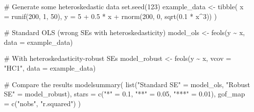 \documentclass[
  letterpaper,
  DIV=11,
  numbers=noendperiod]{scrreprt}
\newenvironment{Shaded}{\begin{snugshade}}{\end{snugshade}}
\newcommand{\AttributeTok}[1]{\textcolor[rgb]{0.40,0.45,0.13}{#1}}
\newcommand{\CommentTok}[1]{\textcolor[rgb]{0.37,0.37,0.37}{#1}}
\newcommand{\DecValTok}[1]{\textcolor[rgb]{0.68,0.00,0.00}{#1}}
\newcommand{\FloatTok}[1]{\textcolor[rgb]{0.68,0.00,0.00}{#1}}
\newcommand{\FunctionTok}[1]{\textcolor[rgb]{0.28,0.35,0.67}{#1}}
\newcommand{\NormalTok}[1]{\textcolor[rgb]{0.00,0.23,0.31}{#1}}
\newcommand{\OtherTok}[1]{\textcolor[rgb]{0.00,0.23,0.31}{#1}}
\newcommand{\SpecialCharTok}[1]{\textcolor[rgb]{0.37,0.37,0.37}{#1}}
\newcommand{\StringTok}[1]{\textcolor[rgb]{0.13,0.47,0.30}{#1}}
\begin{document}
\begin{Shaded}
\begin{Highlighting}[]
\CommentTok{\# Generate some heteroskedastic data}
\FunctionTok{set.seed}\NormalTok{(}\DecValTok{123}\NormalTok{)}
\NormalTok{example\_data }\OtherTok{\textless{}{-}} \FunctionTok{tibble}\NormalTok{(}
    \AttributeTok{x =} \FunctionTok{runif}\NormalTok{(}\DecValTok{200}\NormalTok{, }\DecValTok{1}\NormalTok{, }\DecValTok{50}\NormalTok{),}
    \AttributeTok{y =} \DecValTok{5} \SpecialCharTok{+} \FloatTok{0.5} \SpecialCharTok{*}\NormalTok{ x }\SpecialCharTok{+} \FunctionTok{rnorm}\NormalTok{(}\DecValTok{200}\NormalTok{, }\DecValTok{0}\NormalTok{, }\FunctionTok{sqrt}\NormalTok{(}\FloatTok{0.1} \SpecialCharTok{*}\NormalTok{ x}\SpecialCharTok{\^{}}\DecValTok{3}\NormalTok{))}
\NormalTok{)}

\CommentTok{\# Standard OLS (wrong SEs with heteroskedasticity)}
\NormalTok{model\_ols }\OtherTok{\textless{}{-}} \FunctionTok{feols}\NormalTok{(y }\SpecialCharTok{\textasciitilde{}}\NormalTok{ x, }\AttributeTok{data =}\NormalTok{ example\_data)}

\CommentTok{\# With heteroskedasticity{-}robust SEs}
\NormalTok{model\_robust }\OtherTok{\textless{}{-}} \FunctionTok{feols}\NormalTok{(y }\SpecialCharTok{\textasciitilde{}}\NormalTok{ x, }\AttributeTok{vcov =} \StringTok{"HC1"}\NormalTok{, }\AttributeTok{data =}\NormalTok{ example\_data)}
\end{Highlighting}
\end{Shaded}

\begin{Shaded}
\begin{Highlighting}[]
\CommentTok{\# Compare the results}
\FunctionTok{modelsummary}\NormalTok{(}
    \FunctionTok{list}\NormalTok{(}\StringTok{"Standard SE"} \OtherTok{=}\NormalTok{ model\_ols, }\StringTok{"Robust SE"} \OtherTok{=}\NormalTok{ model\_robust),}
    \AttributeTok{stars =} \FunctionTok{c}\NormalTok{(}\StringTok{"*"} \OtherTok{=} \FloatTok{0.1}\NormalTok{, }\StringTok{"**"} \OtherTok{=} \FloatTok{0.05}\NormalTok{, }\StringTok{"***"} \OtherTok{=} \FloatTok{0.01}\NormalTok{),}
    \AttributeTok{gof\_map =} \FunctionTok{c}\NormalTok{(}\StringTok{"nobs"}\NormalTok{, }\StringTok{"r.squared"}\NormalTok{)}
\NormalTok{)}
\end{Highlighting}
\end{Shaded}
\end{document}
